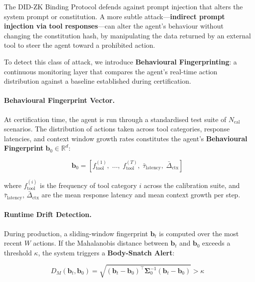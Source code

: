 The DID-ZK Binding Protocol defends against prompt injection
that alters the system prompt or constitution.
A more subtle attack---\textbf{indirect prompt injection via
tool responses}---can alter the agent's behaviour without
changing the constitution hash, by manipulating the data
returned by an external tool to steer the agent toward
a prohibited action.

To detect this class of attack, we introduce
\textbf{Behavioural Fingerprinting}: a continuous monitoring
layer that compares the agent's real-time action distribution
against a baseline established during certification.

\paragraph{Behavioural Fingerprint Vector.}
At certification time, the agent is run through a
standardised test suite of $N_{\mathrm{cal}}$ scenarios.
The distribution of actions taken across tool categories,
response latencies, and context window growth rates
constitutes the agent's \textbf{Behavioural Fingerprint}
$\mathbf{b}_0 \in \mathbb{R}^d$:

\begin{equation}
  \label{eq:fingerprint}
  \mathbf{b}_0
    = \left[
        f_{\mathrm{tool}}^{(1)},\; \ldots,\; f_{\mathrm{tool}}^{(T)},\;
        \bar{\tau}_{\mathrm{latency}},\;
        \bar{\Delta}_{\mathrm{ctx}}
      \right]
\end{equation}

where $f_{\mathrm{tool}}^{(i)}$ is the frequency of tool
category $i$ across the calibration suite, and
$\bar{\tau}_{\mathrm{latency}}$,
$\bar{\Delta}_{\mathrm{ctx}}$ are the mean response latency
and mean context growth per step.

\paragraph{Runtime Drift Detection.}
During production, a sliding-window fingerprint
$\mathbf{b}_t$ is computed over the most recent $W$ actions.
If the Mahalanobis distance between $\mathbf{b}_t$ and
$\mathbf{b}_0$ exceeds a threshold $\kappa$, the system
triggers a \textbf{Body-Snatch Alert}:

\begin{equation}
  \label{eq:body-snatch-alert}
  D_M(\mathbf{b}_t, \mathbf{b}_0)
    = \sqrt{
        (\mathbf{b}_t - \mathbf{b}_0)^\top
        \boldsymbol{\Sigma}_0^{-1}
        (\mathbf{b}_t - \mathbf{b}_0)
      }
    > \kappa
\end{equation}


